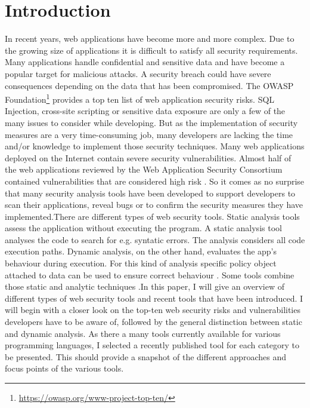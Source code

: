 \section{Introduction}
\label{section:Introduction}
In recent years, web applications have become more and more complex. Due to the growing size of applications it is difficult to satisfy all security requirements. Many applications handle confidential and sensitive data and have become a popular target for malicious attacks. A security breach could have severe consequences depending on the data that has been compromised.\newline
The OWASP Foundation\footnote{ \url{https://owasp.org/www-project-top-ten/}} provides a top ten list of web application security risks. SQL Injection, cross-site scripting or sensitive data exposure are only a few of the many issues to consider while developing. But as the implementation of security measures are a very time-consuming job, many developers are lacking the time and/or knowledge to implement those security techniques. Many web applications deployed on the Internet contain severe security vulnerabilities. Almost half of the web applications reviewed by the Web Application Security Consortium contained vulnerabilities that are considered high risk \autocite[2]{Li2014}.
So it comes as no surprise that many security analysis tools have been developed to support developers to scan their applications, reveal bugs or to confirm the security measures they have implemented.\newline There are different types of web security tools. Static analysis tools assess the application without executing the program. A static analysis tool analyses the code to search for e.g. syntatic errors. The analysis considers all code execution paths. Dynamic analysis, on the other hand, evaluates the app's behaviour during execution. For this kind of analysis specific policy object attached to data can be used to ensure correct behaviour \autocite[]{Yip2009, Felt2011}. Some tools combine those static and analytic techniques \autocite[]{Araujo2018, Jahanshahi2018, Lam2008,Hosek2011}.\newline In this paper, I will give an overview of different types of web security tools and recent tools that have been introduced. I will begin with a closer look on the top-ten web security risks and vulnerabilities developers have to be aware of, followed by the general distinction between static and dynamic analysis. As there a many tools currently available for various programming languages, I selected a recently published tool for each category to be presented. This should provide a snapshot of the different approaches and focus points of the various tools.

